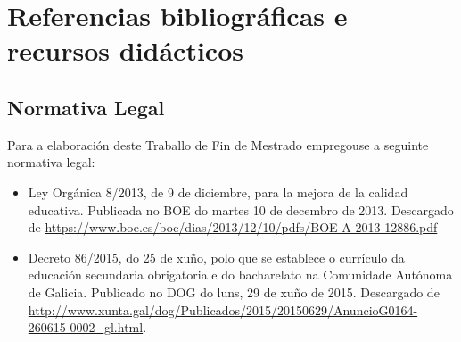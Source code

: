 \chapter{Referencias bibliográficas e recursos didácticos}

\nocite{*}  %




\section{Normativa Legal}
Para a elaboración deste Traballo de Fin de Mestrado empregouse a seguinte normativa legal:
\sloppy
\begin{itemize}
    \item Ley Orgánica 8/2013, de 9 de diciembre, para la mejora de la calidad educativa. Publicada no BOE do martes 10 de decembro de 2013. Descargado de \href{https://www.boe.es/boe/dias/2013/12/10/pdfs/BOE-A-2013-12886.pdf}{https://www.boe.es/boe/dias/2013/12/10/pdfs/BOE-A-2013-12886.pdf}
    \item Decreto 86/2015, do 25 de xuño, polo que se establece o currículo da educación secundaria obrigatoria e do bacharelato na Comunidade Autónoma de Galicia. Publicado no DOG do luns, 29 de xuño de 2015. Descargado de \href{http://www.xunta.gal/dog/Publicados/2015/20150629/AnuncioG0164-260615-0002\_gl.html}{http://www.xunta.gal/dog/Publicados/2015/20150629/AnuncioG0164-260615-0002\_gl.html}.
\end{itemize}
